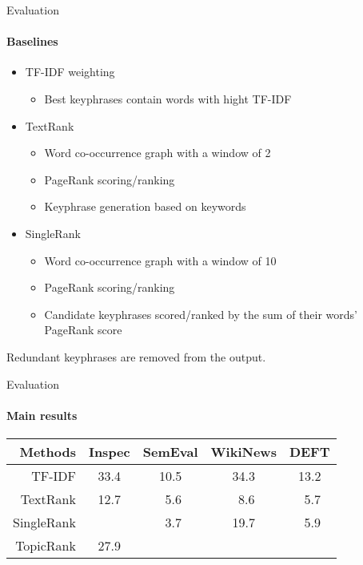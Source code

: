   \begin{frame}{Evaluation}
    \framesubtitle{Baselines}

    \begin{itemize}
      \item{TF-IDF weighting}
      \begin{itemize}
        [triangle]
        \item{Best keyphrases contain words with hight TF-IDF}
      \end{itemize}
      \item{TextRank}
      \begin{itemize}
        [triangle]
        \item{Word co-occurrence graph with a window of 2}
        \item{PageRank scoring/ranking}
        \item{Keyphrase generation based on keywords}
      \end{itemize}
      \item{SingleRank}
      \begin{itemize}
        [triangle]
        \item{Word co-occurrence graph with a window of 10}
        \item{PageRank scoring/ranking}
        \item{Candidate keyphrases scored/ranked by the sum of their words' PageRank score}
      \end{itemize}
    \end{itemize}

    Redundant keyphrases are removed from the output.
  \end{frame}

  \begin{frame}{Evaluation}
    \framesubtitle{Main results}
    
    \begin{center}
      \begin{tabular}{rcccc}
        \toprule
        Methods & Inspec & SemEval & WikiNews & DEFT\\
        \midrule
        TF-IDF & 33.4 & 10.5 & 34.3 & 13.2\\
        TextRank & 12.7 & $~~$5.6 & $~~$8.6 & $~~$5.7\\
        SingleRank & \cellcolor{pink}{35.2} & $~~$3.7 & 19.7 & $~~$5.9\\
        TopicRank & 27.9 & \cellcolor{pink}{12.1} & \cellcolor{pink}{35.6} & \cellcolor{pink}{15.1}\\
        \bottomrule
      \end{tabular}
    \end{center}
  \end{frame}

